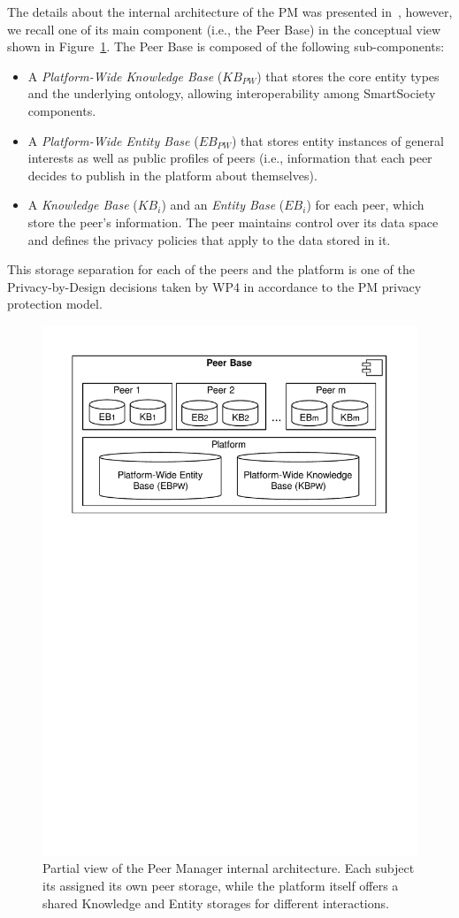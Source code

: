 The details about the internal architecture of the PM was presented in~\cite{D4.2,Hartswood:2015fe}, however, we recall one of its main component (i.e., the Peer Base) in the conceptual view shown in Figure~\ref{fig:peerManagerPlatform}. The Peer Base is composed of the following sub-components: 
\begin{itemize}
\item A \emph{Platform-Wide Knowledge Base} (${KB}_{PW}$) that stores the core entity types and the underlying ontology, allowing interoperability among SmartSociety components. 
\item A \emph{Platform-Wide Entity Base} (${EB}_{PW}$) that stores entity instances of general interests as well as public profiles of peers (i.e., information that each peer decides to publish in the platform about themselves).
\item A \emph{Knowledge Base} (${KB}_i$) and an \emph{Entity Base} (${EB}_i$) for each peer, which store the peer’s information. The peer maintains control over its data space and defines the privacy policies that apply to the data stored in it. 
\end{itemize}
This storage separation for each of the peers and the platform is one of the Privacy-by-Design decisions taken by WP4 in accordance to the PM  privacy protection model.
%

\begin{figure}[t]
	\centering
	\includegraphics[width=0.65\linewidth]{figures/peerBase-diagram.pdf}
	\caption{Partial view of the Peer Manager internal architecture. Each subject its assigned its own peer storage, while the platform itself offers a shared Knowledge and Entity storages for different interactions.}
	\label{fig:peerManagerPlatform}
\end{figure}




